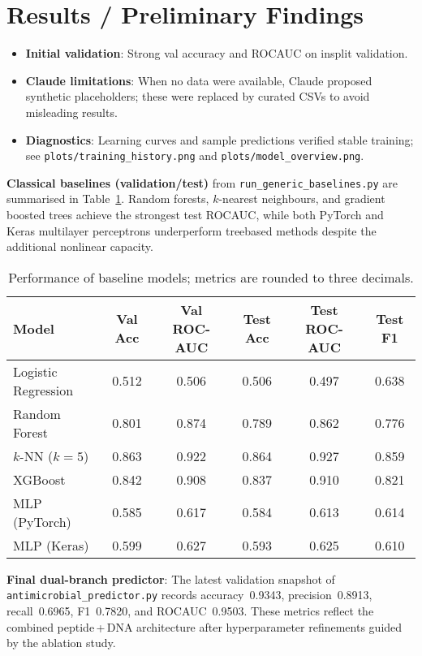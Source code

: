 \documentclass{article}
\begin{document}
\section{Results / Preliminary Findings}
\begin{itemize}[leftmargin=*,nosep]
  \item \textbf{Initial validation}: Strong val accuracy and ROC\-AUC on in\-split validation.
  \item \textbf{Claude limitations}: When no data were available, Claude proposed synthetic placeholders; these were replaced by curated CSVs to avoid misleading results.
  \item \textbf{Diagnostics}: Learning curves and sample predictions verified stable training; see \texttt{plots/training\_history.png} and \texttt{plots/model\_overview.png}.
\end{itemize}

\noindent\textbf{Classical baselines (validation/test)} from \texttt{run\_generic\_baselines.py} are summarised in Table~\ref{tab:baselines}. Random forests, $k$-nearest neighbours, and gradient boosted trees achieve the strongest test ROC\-AUC, while both PyTorch and Keras multilayer perceptrons underperform tree\-based methods despite the additional nonlinear capacity.

\begin{table}[h]
  \centering
  \caption{Performance of baseline models; metrics are rounded to three decimals.}
  \label{tab:baselines}
  \begin{tabular}{lccccc}
    \toprule
    Model & Val Acc & Val ROC-AUC & Test Acc & Test ROC-AUC & Test F1 \\
    \midrule
    Logistic Regression & 0.512 & 0.506 & 0.506 & 0.497 & 0.638 \\
    Random Forest & 0.801 & 0.874 & 0.789 & 0.862 & 0.776 \\
    $k$-NN ($k=5$) & 0.863 & 0.922 & 0.864 & 0.927 & 0.859 \\
    XGBoost & 0.842 & 0.908 & 0.837 & 0.910 & 0.821 \\
    MLP (PyTorch) & 0.585 & 0.617 & 0.584 & 0.613 & 0.614 \\
    MLP (Keras) & 0.599 & 0.627 & 0.593 & 0.625 & 0.610 \\
    \bottomrule
  \end{tabular}
\end{table}

\noindent\textbf{Final dual-branch predictor}: The latest validation snapshot of \texttt{antimicrobial\_predictor.py} records accuracy~0.9343, precision~0.8913, recall~0.6965, F1~0.7820, and ROC\-AUC~0.9503. These metrics reflect the combined peptide\,+\,DNA architecture after hyperparameter refinements guided by the ablation study.
\end{document}
